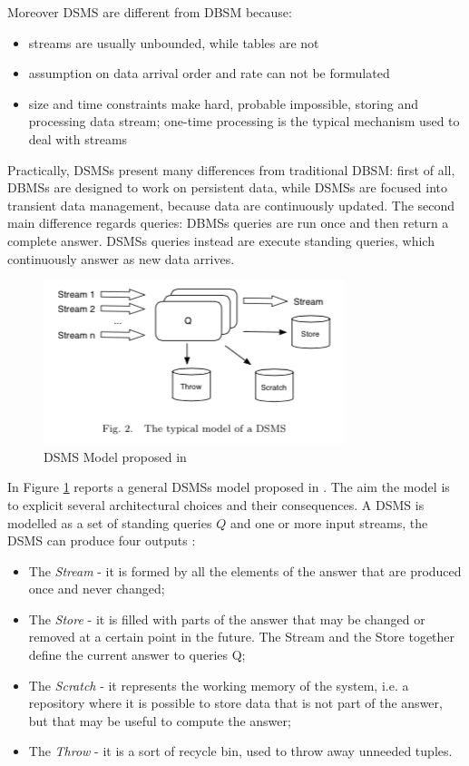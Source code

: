 Moreover DSMS are different from DBSM because: 
\begin{itemize}
\item streams are usually unbounded, while tables are not
\item assumption on data arrival order and rate can not be formulated
\item size and time constraints make hard, probable impossible, storing and processing data stream; one-time processing is the typical mechanism used to deal with streams
\end{itemize} 

Practically, DSMSs present many differences from traditional DBSM: first of all, DBMSs are designed to work on persistent data, while DSMSs are focused into transient data management, because data are continuously updated. The second main difference regards queries: DBMSs queries are run once and then return a complete answer. DSMSs queries instead are execute standing queries, which continuously answer as new data arrives. 

\begin{figure}[tbh]
  \centering
	\includegraphics[width=0.75\linewidth]{images/dsms}
	\caption{DSMS Model proposed in \cite{Babu:2001:CQO:603867.603884}  } 
  	\label{fig:dsms}
\end{figure}

In Figure \ref{fig:dsms} reports a general DSMSs model proposed in \cite{Babu:2001:CQO:603867.603884}. The aim the model is to explicit several architectural choices and their consequences. A DSMS is modelled as a set of standing queries $Q$ and one or more input streams, the DSMS can produce four outputs \cite{Cugola:2012:PFI:2187671.2187677}:

\begin{itemize}
\item The \textit{Stream} - it is formed by all the elements of the answer that are produced once and never changed;
\item The \textit{Store} - it is filled with parts of the answer that may be changed or removed at a certain point in the future. The Stream and the Store together define the current answer to queries Q;
\item The \textit{Scratch} - it represents the working memory of the system, i.e. a repository where it is possible to store data that is not part of the answer, but that may be useful to compute the answer;
\item The \textit{Throw} - it is a sort of recycle bin, used to throw away unneeded tuples.
\end{itemize}


